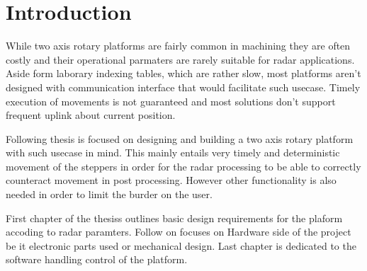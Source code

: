 
\chapter*{Introduction}

While two axis rotary platforms are fairly common in  machining they are often costly and their operational parmaters are rarely suitable for radar applications.
Aside form laborary indexing tables, which are rather slow, most platforms aren't designed with communication interface that would facilitate such usecase.
Timely execution of movements is not guaranteed and most solutions don't support frequent uplink about current position.

Following thesis is focused on designing and building a two axis rotary platform with such usecase in mind.
This mainly entails very timely and deterministic movement of the steppers in order for the radar processing to be able to correctly counteract movement in post processing.
However other functionality is also needed in order to limit the burder on the user.


First chapter of the thesiss outlines basic design requirements for the plaform accoding to radar paramters.
Follow on focuses on Hardware side of the project be it electronic parts used or mechanical design.
Last chapter is dedicated to the software handling control of the platform.
